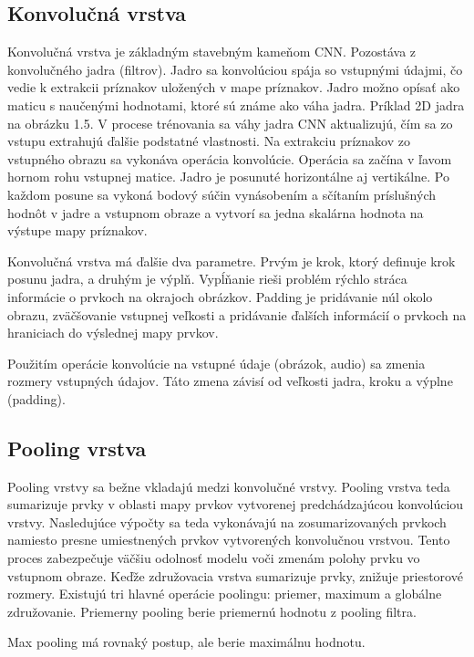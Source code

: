 \subsection{Konvolučná vrstva}\label{subsec:konvolucna_vrstva}

Konvolučná vrstva je základným stavebným kameňom CNN. Pozostáva z
konvolučného jadra (filtrov). Jadro sa konvolúciou spája so vstupnými údajmi, čo
vedie k extrakcii príznakov uložených v mape príznakov. Jadro možno opísať ako
maticu s naučenými hodnotami, ktoré sú známe ako
váha jadra. Príklad 2D jadra na obrázku 1.5. V procese trénovania sa váhy jadra
CNN aktualizujú, čím sa zo vstupu extrahujú ďalšie podstatné vlastnosti.
Na extrakciu príznakov zo vstupného obrazu sa vykonáva operácia konvolúcie.
Operácia sa začína v ľavom hornom rohu vstupnej matice. Jadro je posunuté
horizontálne aj vertikálne. Po každom posune sa vykoná bodový súčin vynásobením a
sčítaním príslušných hodnôt v jadre a vstupnom obraze a vytvorí sa jedna skalárna
hodnota na výstupe mapy príznakov.

Konvolučná vrstva má ďalšie dva parametre. Prvým je krok, ktorý definuje krok
posunu jadra, a druhým je výplň. Vypĺňanie rieši problém rýchlo stráca informácie o prvkoch na okrajoch obrázkov. Padding je pridávanie núl
okolo obrazu, zväčšovanie vstupnej veľkosti a pridávanie ďalších informácií o prvkoch
na hraniciach do výslednej mapy prvkov.

Použitím operácie konvolúcie na vstupné údaje (obrázok, audio) sa zmenia rozmery
vstupných údajov. Táto zmena závisí od veľkosti jadra, kroku a výplne (padding).

\subsection{Pooling vrstva}\label{subsec:pooling_vrstva}

Pooling vrstvy sa bežne vkladajú medzi konvolučné vrstvy. Pooling vrstva
teda sumarizuje prvky v oblasti mapy prvkov vytvorenej predchádzajúcou
konvolúciou vrstvy. Nasledujúce výpočty sa teda vykonávajú na zosumarizovaných
prvkoch namiesto presne umiestnených prvkov vytvorených konvolučnou vrstvou.
Tento proces zabezpečuje väčšiu odolnosť modelu voči zmenám polohy prvku vo
vstupnom obraze. Keďže združovacia vrstva sumarizuje prvky, znižuje priestorové
rozmery.
Existujú tri hlavné operácie poolingu: priemer, maximum a globálne
združovanie. Priemerny pooling berie priemernú hodnotu z pooling filtra.

Max pooling má rovnaký postup, ale berie maximálnu hodnotu.

